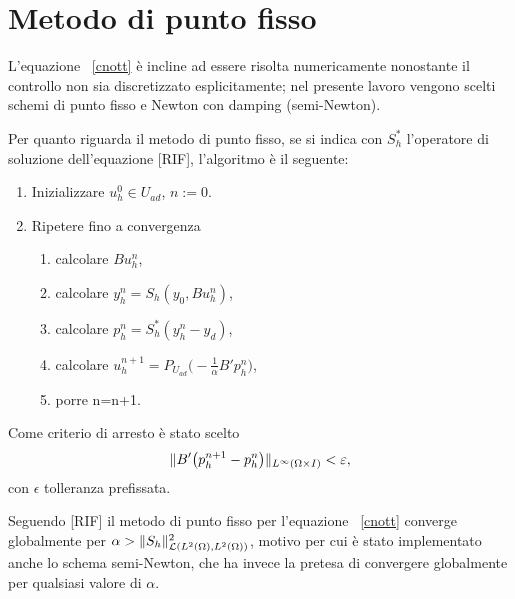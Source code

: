 \section{Metodo di punto fisso}

L'equazione ~\eqref{cnott} è incline ad essere risolta numericamente nonostante il controllo non sia discretizzato esplicitamente; nel presente lavoro vengono scelti schemi di punto fisso e Newton con damping (semi-Newton).

Per quanto riguarda il metodo di punto fisso, se si indica con $ S^*_h $ l'operatore di soluzione dell'equazione [RIF], l'algoritmo è il seguente:
\begin{algoritmo}

\begin{enumerate}
\item Inizializzare $ u^0_h\in U_{ad} $, $ n:=0 $.
\item Ripetere fino a convergenza
          \begin{enumerate}
          \item calcolare $ Bu^n_h $,
          \item calcolare $ y^n_h=S_h(y_0,Bu^n_h) $, 
          \item calcolare $ p^n_h=S^*_h(y^n_h-y_d) $,
          \item calcolare $ u^{n+1}_h=P_{U_{ad}}\big( -\frac{1}{\alpha}B'p^n_h\big) $,
          \item porre n=n+1.
          \end{enumerate}
\end{enumerate}

Come criterio di arresto è stato scelto   
\begin{equation}
\lVert B'\big(p^{n+1}_h-p^n_h\big)\rVert_{L^{\infty}(\Omega\times I)}<\varepsilon,
\end{equation}
con $ \epsilon $ tolleranza prefissata.

\end{algoritmo}

Seguendo [RIF] il metodo di punto fisso per l'equazione ~\eqref{cnott} converge globalmente per $ \alpha>\lVert S_h\rVert^2_{\mathcal{L}(L^2(\Omega),L^2(\Omega))} $, motivo per cui è stato implementato anche lo schema semi-Newton, che ha invece la pretesa di convergere globalmente per qualsiasi valore di $ \alpha $.
